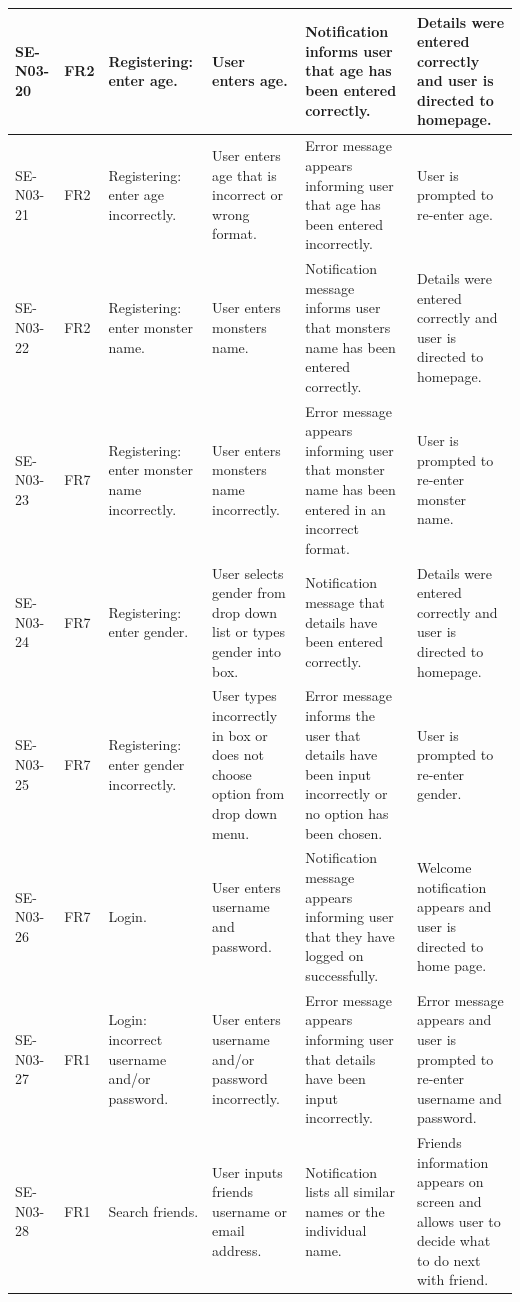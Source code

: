 \documentclass[a4paper]{article}
\begin{document}
\begin{landscape}
\begin{center}
\thispagestyle{empty}		
	\begin{tabular}{| l | l | p{3cm} | p{3cm} | p{5cm} | p{7cm} |}
	\hline
	SE-N03-20 & FR2 & Registering: enter age. & User enters age. & Notification informs user that age has been entered correctly. &  Details were entered correctly and user is directed to homepage. \\
	\hline
	SE-N03-21 & FR2 & Registering: enter age incorrectly. &  User enters age that is incorrect or wrong format. & Error message appears informing user that age has been entered incorrectly. & User is prompted to re-enter age.\\
	\hline
	SE-N03-22 & FR2 & Registering: enter monster name. & User enters monsters name. &  Notification message informs user that monsters name has been entered correctly. & Details were entered correctly and user is directed to homepage.\\
	\hline
	SE-N03-23 & FR7 & Registering: enter monster name incorrectly. & User enters monsters name incorrectly. & Error message appears informing user that monster name has been entered in an incorrect format. & User is prompted to re-enter monster name.\\
	\hline
	SE-N03-24 & FR7 & Registering: enter gender. & User selects gender from drop down list or types gender into box. & Notification message that details have been entered correctly. & Details were entered correctly and user is directed to homepage.\\
	\hline
	SE-N03-25 & FR7 & Registering: enter gender incorrectly. & User types incorrectly in box or does not choose option from drop down menu. & Error message informs the user that details have been input incorrectly or no option has been chosen. &  User is prompted to re-enter gender. \\
	\hline
	SE-N03-26 & FR7 & Login. &  User enters username and password. & Notification message appears informing user that they have logged on successfully. & Welcome notification appears and user is directed to home page. \\
	\hline
	SE-N03-27 & FR1 & Login: incorrect username and/or password. &  User enters username and/or password incorrectly. & Error message appears informing user that details have been input incorrectly. &  Error message appears and user is prompted to re-enter username and password.\\
	\hline
	SE-N03-28 & FR1 & Search friends. &  User inputs friends username or email address. & Notification lists all similar names or the individual name. & Friends information appears on screen and allows user to decide what to do next with friend.\\

\end{tabular}
\end{center}
\end{landscape}
\end{document}
